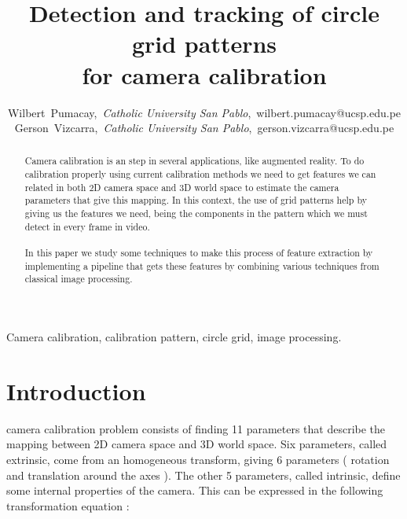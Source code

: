 \documentclass[journal]{IEEEtran}
\begin{document}
\title{Detection and tracking of circle grid patterns \\ for camera calibration}

\author{Wilbert~Pumacay,~\textit{Catholic University San Pablo},~wilbert.pumacay@ucsp.edu.pe\\
        Gerson~Vizcarra,~\textit{Catholic University San Pablo},~gerson.vizcarra@ucsp.edu.pe}

\maketitle

\begin{abstract}
Camera calibration is an step in several applications, like augmented reality. To do calibration properly using current calibration methods we need to get features we can related in both 2D camera space and 3D world space to estimate the camera parameters that give this mapping. In this context, the use of grid patterns help by giving us the features we need, being the components in the pattern which we must detect in every frame in video.
\\
\\
In this paper we study some techniques to make this process of feature extraction by implementing a pipeline that gets these features by combining various techniques from classical image processing.
\end{abstract}

\begin{IEEEkeywords}
Camera calibration, calibration pattern, circle grid, image processing.
\end{IEEEkeywords}


\section{Introduction}

 camera calibration problem consists of finding 11 parameters that describe the mapping between 2D camera space and 3D world space. Six parameters, called extrinsic, come from an homogeneous transform, giving 6 parameters ( rotation and translation around the axes ). The other 5 parameters, called intrinsic, define some internal properties of the camera. This can be expressed in the following transformation equation :
\end{document}
